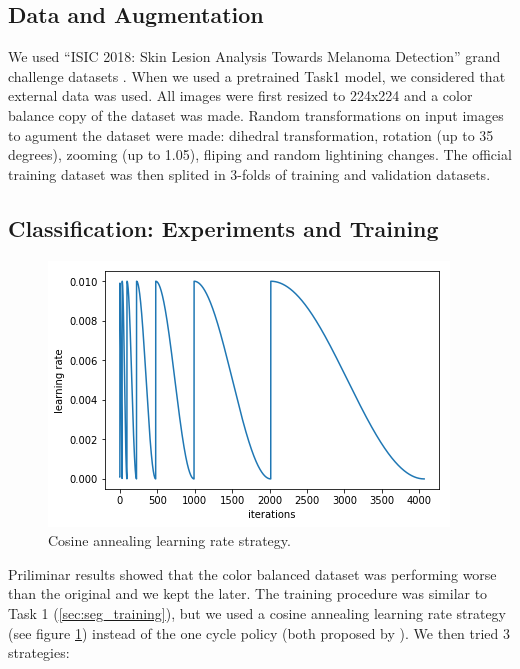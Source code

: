 \documentclass[conference]{IEEEtran}
\begin{document}
\subsection{Data and Augmentation}
We used “ISIC 2018: Skin Lesion Analysis Towards Melanoma Detection” grand challenge datasets \cite{codella, ham}. When we used a pretrained Task1 model, we considered that external data was used. All images were first resized to 224x224 and a color balance copy of the dataset was made. Random transformations on input images to agument the dataset were made: dihedral transformation, rotation (up to 35 degrees), zooming (up to 1.05), fliping and random lightining changes. The official training dataset was then splited in 3-folds of training and validation datasets.  


\subsection{Classification: Experiments and Training}
\begin{figure}[htbp]
\centerline{\includegraphics[width=.8\columnwidth]{cycle.png}}
\caption{Cosine annealing learning rate strategy. \label{cosine}}
\end{figure}


Priliminar results showed that the color balanced dataset was performing worse than the original and we kept the later. The training procedure was similar to Task 1 (\ref{sec:seg_training}), but we used a cosine annealing learning rate strategy (see figure \ref{cosine}) instead of the one cycle policy (both proposed by \cite{leslie}). We then tried 3 strategies:
\end{document}
